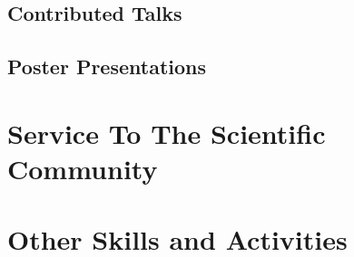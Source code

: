 \subsection{Contributed Talks}


\subsection{Poster Presentations}


\section{Service To The Scientific Community}


\vspace{-2mm}
\section{Other Skills and Activities}



